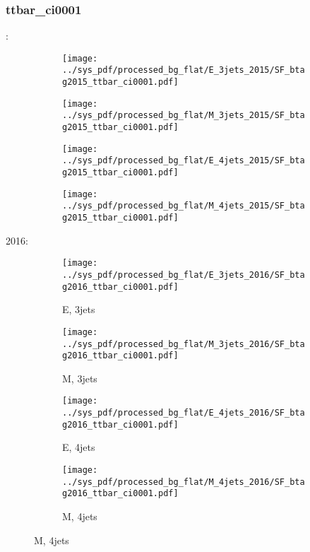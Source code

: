 \documentclass{beamer}
\begin{document}
\begin{frame}
\frametitle{ttbar_ci0001}
\fontsize{5}{1}:
\begin{figure}
\centering
\begin{subfigure}[b]{0.24\textwidth}
\texttt{[image: ../sys\_pdf/processed\_bg\_flat/E\_3jets\_2015/SF\_btag2015\_ttbar\_ci0001.pdf]}
\end{subfigure}
\begin{subfigure}[b]{0.24\textwidth}
\texttt{[image: ../sys\_pdf/processed\_bg\_flat/M\_3jets\_2015/SF\_btag2015\_ttbar\_ci0001.pdf]}
\end{subfigure}
\begin{subfigure}[b]{0.24\textwidth}
\texttt{[image: ../sys\_pdf/processed\_bg\_flat/E\_4jets\_2015/SF\_btag2015\_ttbar\_ci0001.pdf]}
\end{subfigure}
\begin{subfigure}[b]{0.24\textwidth}
\texttt{[image: ../sys\_pdf/processed\_bg\_flat/M\_4jets\_2015/SF\_btag2015\_ttbar\_ci0001.pdf]}
\end{subfigure}
\end{figure}
2016:
\begin{figure}
\centering
\begin{subfigure}[b]{0.24\textwidth}
\texttt{[image: ../sys\_pdf/processed\_bg\_flat/E\_3jets\_2016/SF\_btag2016\_ttbar\_ci0001.pdf]}
\captionsetup{font=tiny}
\caption{E, 3jets}
\end{subfigure}
\begin{subfigure}[b]{0.24\textwidth}
\texttt{[image: ../sys\_pdf/processed\_bg\_flat/M\_3jets\_2016/SF\_btag2016\_ttbar\_ci0001.pdf]}
\captionsetup{font=tiny}
\caption{M, 3jets}
\end{subfigure}
\begin{subfigure}[b]{0.24\textwidth}
\texttt{[image: ../sys\_pdf/processed\_bg\_flat/E\_4jets\_2016/SF\_btag2016\_ttbar\_ci0001.pdf]}
\captionsetup{font=tiny}
\caption{E, 4jets}
\end{subfigure}
\begin{subfigure}[b]{0.24\textwidth}
\texttt{[image: ../sys\_pdf/processed\_bg\_flat/M\_4jets\_2016/SF\_btag2016\_ttbar\_ci0001.pdf]}
\captionsetup{font=tiny}
\caption{M, 4jets}
\end{subfigure}
\end{figure}
\end{frame}
\end{document}
